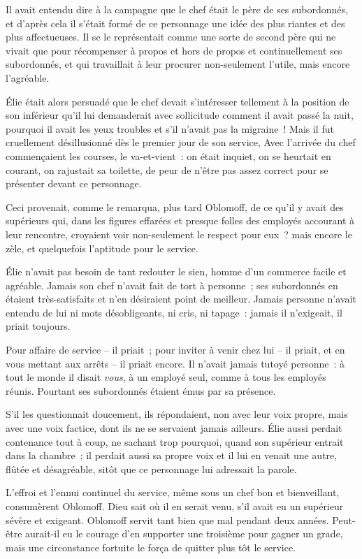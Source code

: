\documentclass[french,twoside]{book} %
\begin{document}
Il avait entendu dire à la campagne que le chef était le père de ses subordonnés, et d’après cela il s’était formé de ce personnage une idée des plus riantes et des plus affectueuses. Il se le représentait comme une sorte de second père qui ne vivait que pour récompenser à propos et hors de propos et continuellement ses subordonnés, et qui travaillait à leur procurer non-seulement l’utile, mais encore l’agréable.\par
Élie était alors persuadé que le chef devait s’intéresser tellement à la position de son inférieur qu’il lui demanderait avec sollicitude comment il avait passé la nuit, pourquoi il avait les yeux troubles et s’il n’avait pas la migraine ! Mais il fut cruellement désillusionné dès le premier jour de son service, Avec l’arrivée du chef commençaient les courses, le va-et-vient : on était inquiet, on se heurtait en courant, on rajustait sa toilette, de peur de n’être pas assez correct pour se présenter devant ce personnage.\par
Ceci provenait, comme le remarqua, plus tard Oblomoff, de ce qu’il y avait des supérieurs qui, dans les figures effarées et presque folles des employés accourant à leur rencontre, croyaient voir non-seulement le respect pour eux ? mais encore le zèle, et quelquefois l’aptitude pour le service.\par
Élie n’avait pas besoin de tant redouter le sien, homme d’un commerce facile et agréable. Jamais son chef n’avait fait de tort à personne ; ses subordonnés en étaient très-satisfaits et n’en désiraient point de meilleur. Jamais personne n’avait entendu de lui ni mots désobligeants, ni cris, ni tapage : jamais il n’exigeait, il priait toujours.\par
Pour affaire de service – il priait ; pour inviter à venir chez lui – il priait, et en vous mettant aux arrêts – il priait encore. Il n’avait jamais tutoyé personne : à tout le monde il disait \emph{vous}, à un employé seul, comme à tous les employés réunis. Pourtant ses subordonnés étaient émus par sa présence.\par
S’il les questionnait doucement, ils répondaient, non avec leur voix propre, mais avec une voix factice, dont ils ne se servaient jamais ailleurs. Élie aussi perdait contenance tout à coup, ne sachant trop pourquoi, quand son supérieur entrait dans la chambre ; il perdait aussi sa propre voix et il lui en venait une autre, flûtée et désagréable, sitôt que ce personnage lui adressait la parole.\par
L’effroi et l’ennui continuel du service, même sous un chef bon et bienveillant, consumèrent Oblomoff. Dieu sait où il en serait venu, s’il avait eu un supérieur sévère et exigeant. Oblomoff servit tant bien que mal pendant deux années. Peut-être aurait-il eu le courage d’en supporter une troisième pour gagner un grade, mais une circonstance fortuite le força de quitter plus tôt le service.\par
\end{document}

